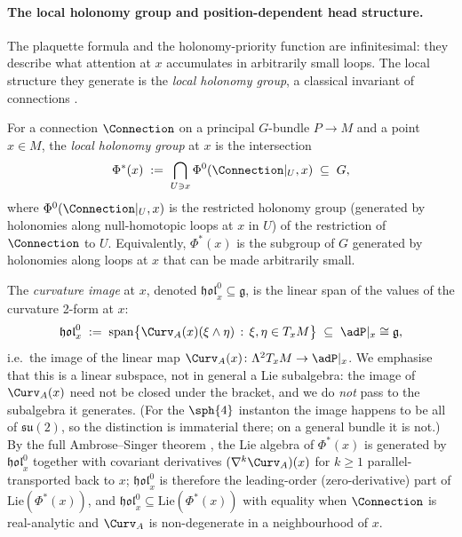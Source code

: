 \paragraph{The local holonomy group and position-dependent head structure.}
The plaquette formula and the holonomy-priority function are
infinitesimal: they describe what attention at $x$ accumulates in
arbitrarily small loops. The local structure they generate is the
\emph{local holonomy group}, a classical invariant of connections
\cite[\S II.4]{KobayashiNomizu}.

\begin{definition}\label{def:local-holonomy}
For a connection $\Connection$ on a principal $G$-bundle $P\to M$
and a point $x\in M$, the \emph{local holonomy group} at $x$ is the
intersection
\[
   \Phi^*(x) \;:=\; \bigcap_{U\ni x}\Phi^0(\Connection|_U,x)
   \;\subseteq\; G,
\]
where $\Phi^0(\Connection|_U,x)$ is the restricted holonomy group
(generated by holonomies along null-homotopic loops at $x$ in $U$)
of the restriction of $\Connection$ to $U$. Equivalently, $\Phi^*(x)$
is the subgroup of $G$ generated by holonomies along loops at $x$
that can be made arbitrarily small.

The \emph{curvature image} at $x$, denoted
$\mathfrak{hol}^0_x\subseteq\mathfrak{g}$, is the linear span of the
values of the curvature 2-form at $x$:
\[
   \mathfrak{hol}^0_x \;:=\; \mathrm{span}\bigl\{\Curv_A(x)(\xi\wedge\eta)
   \,:\, \xi,\eta\in T_xM\bigr\}
   \;\subseteq\;\adP|_x\cong\mathfrak{g},
\]
i.e.\ the image of the linear map
$\Curv_A(x)\colon\Lambda^2 T_xM\to\adP|_x$. We emphasise that this
is a linear subspace, not in general a Lie subalgebra: the image of
$\Curv_A(x)$ need not be closed under the bracket, and we do
\emph{not} pass to the subalgebra it generates. (For the $\sph{4}$
instanton the image happens to be all of $\mathfrak{su}(2)$, so the
distinction is immaterial there; on a general bundle it is not.) By the full
Ambrose--Singer theorem \cite[\S II.8]{KobayashiNomizu}, the Lie
algebra of $\Phi^*(x)$ is generated by $\mathfrak{hol}^0_x$ together
with covariant derivatives
$(\nabla^k\Curv_A)(x)$ for $k\geq 1$ parallel-transported back to
$x$; $\mathfrak{hol}^0_x$ is therefore the leading-order
(zero-derivative) part of $\mathrm{Lie}(\Phi^*(x))$, and
$\mathfrak{hol}^0_x\subseteq\mathrm{Lie}(\Phi^*(x))$ with equality
when $\Connection$ is real-analytic and $\Curv_A$ is non-degenerate
in a neighbourhood of $x$.
\end{definition}

